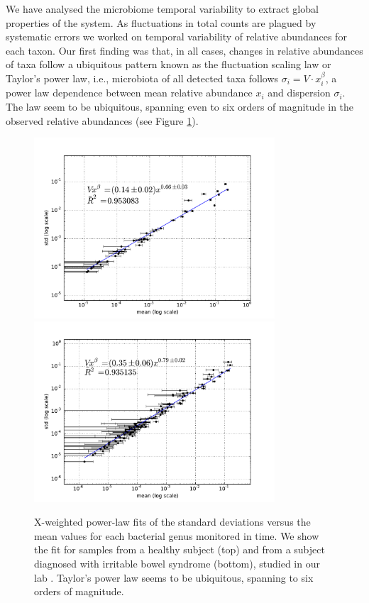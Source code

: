 
We have analysed the microbiome temporal variability to extract global properties of the system. As fluctuations in total counts are plagued by systematic errors we worked on temporal variability of relative abundances for each taxon. Our first finding was that, in all cases, changes in relative abundances of taxa follow a ubiquitous pattern known as the fluctuation scaling law\cite{fs} or Taylor's  power law\cite{taylor}, i.e., microbiota of all detected taxa follows $\sigma_i  = V\cdot x_i^{\beta}$, a power law dependence between mean relative abundance $x_i$ and dispersion $\sigma_i$. The law seem to be ubiquitous, spanning even to six orders of magnitude in the observed relative abundances (see Figure \ref{fig:main1}). 

\begin{figure}
	\centering
	\vspace*{-15mm} %
	\includegraphics[width=0.8\textwidth]{results/fits/IBS_h_A_amplicons_family_stdVSmean_xWboot_LOG.pdf}
	\includegraphics[width=0.8\textwidth]{results/fits/IBS_P2_Metatranscriptores_stdVSmean_xWboot_LOG.pdf}
	\caption{X-weighted power-law fits of the standard deviations versus the mean values for each bacterial genus monitored in time. We show the fit for samples from a healthy subject (top) and from a subject diagnosed with irritable bowel syndrome (bottom), studied in our lab \cite{IBS}. Taylor's power law seems to be ubiquitous, spanning to six orders of magnitude.}
	\label{fig:main1}
\end{figure}

